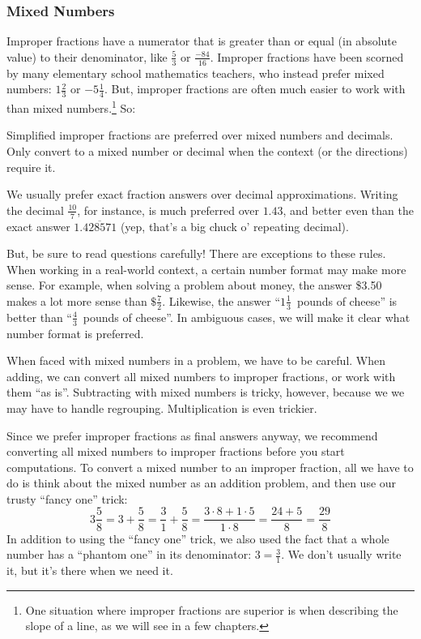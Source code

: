 \subsubsection*{Mixed Numbers}

Improper fractions have a numerator that is greater than or equal (in absolute value) to their denominator, like $\frac{5}{3}$ or $\frac{-84}{16}$. Improper fractions have been scorned by many elementary school mathematics teachers, who instead prefer mixed numbers: $1\frac{2}{3}$ or $-5\frac{1}{4}$. But, improper fractions are often much easier to work with than mixed numbers.\footnote{One situation where improper fractions are superior is when describing the slope of a line, as we will see in a few chapters.} So:

\begin{boxedcriteria}
Simplified \glspl{improper fraction} are preferred over \glspl{mixed number} and decimals. Only convert to a mixed number or decimal when the context (or the directions) require it.
\end{boxedcriteria}

We usually prefer exact fraction answers over decimal approximations. Writing the decimal $\frac{10}{7}$, for instance, is much preferred over $1.43$, and better even than the exact answer $1.\overline{428571}$ (yep, that's a big chuck o' repeating decimal).

But, be sure to read questions carefully! There are exceptions to these rules. When working in a real-world context, a certain number format may make more sense. For example, when solving a problem about money, the answer \$3.50 makes a lot more sense than $\$\frac{7}{2}$. Likewise, the answer ``$1\frac{1}{3}$~pounds of cheese'' is better than ``$\frac{4}{3}$~pounds of cheese''. In ambiguous cases, we will make it clear what number format is preferred.

When faced with mixed numbers in a problem, we have to be careful. When adding, we can convert all mixed numbers to improper fractions, or work with them ``as is''. Subtracting with mixed numbers is tricky, however, because we we may have to handle regrouping. Multiplication is even trickier.

Since we prefer improper fractions as final answers anyway, we recommend converting all mixed numbers to improper fractions before you start computations. To convert a mixed number to an improper fraction, all we have to do is think about the mixed number as an addition problem, and then use our trusty ``fancy one'' trick:
\[3\frac{5}{8} = 3 + \frac{5}{8} = \frac{3}{1} + \frac{5}{8} = \frac{3 \cdot 8 + 1 \cdot 5}{1 \cdot 8} = \frac{24 + 5}{8} = \frac{29}{8}\]
In addition to using the ``fancy one'' trick, we also used the fact that a whole number has a ``phantom one'' in its denominator: $3 = \frac{3}{1}$. We don't usually write it, but it's there when we need it.

